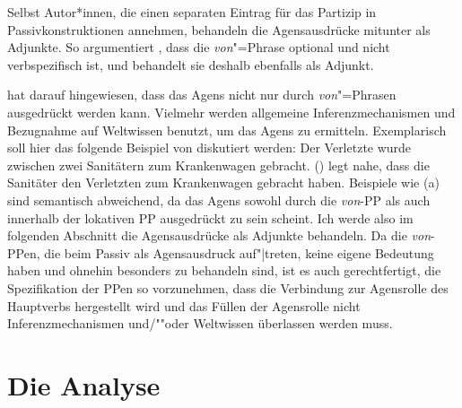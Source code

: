 Selbst Autor*innen, die einen separaten Eintrag für das Partizip in Passivkonstruktionen annehmen, behandeln
die Agensausdrücke mitunter als Adjunkte. So argumentiert \zb \citet[]{Zifonun92a}, dass die \emph{von}"=Phrase 
optional und nicht verbspezifisch ist, und behandelt sie deshalb ebenfalls als Adjunkt.


\citet[Kapitel~7]{Hoehle78a} hat darauf hingewiesen, dass das Agens nicht nur durch
\emph{von}"=Phrasen ausgedrückt werden kann. Vielmehr werden allgemeine Inferenzmechanismen und Bezugnahme auf
Weltwissen benutzt, um das Agens zu ermitteln. Exemplarisch soll hier das folgende Beispiel von \citet[]{Hoehle78a}
diskutiert werden:
\ea
Der Verletzte wurde zwischen zwei Sanitätern zum Krankenwagen gebracht.
\z
() legt nahe, dass die Sanitäter den Verletzten zum Krankenwagen gebracht haben.
Beispiele wie (a) sind semantisch abweichend, da das Agens sowohl
durch die \emph{von}-PP als auch innerhalb der lokativen PP ausgedrückt zu sein scheint.
\eal
\label{ex-sanitaeter}
\zl
Ich werde also im folgenden Abschnitt die Agensausdrücke als Adjunkte behandeln. Da
die \emph{von}-PPen, die beim Passiv als Agensausdruck auf"|treten, keine eigene Bedeutung
haben und ohnehin besonders zu behandeln sind, ist es auch gerechtfertigt, die Spezifikation
der PPen so vorzunehmen, dass die Verbindung zur Agensrolle des Hauptverbs hergestellt wird
und das Füllen der Agensrolle nicht Inferenzmechanismen und/""oder Weltwissen
überlassen werden muss.
 


\section{Die Analyse}
\label{sec-passive-anal}

